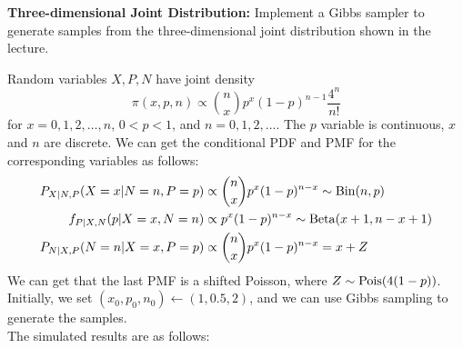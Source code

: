\begin{homeworkProblem}

\textbf{Three-dimensional Joint Distribution:} Implement a Gibbs sampler to generate samples from the three-dimensional joint distribution shown in the lecture.

\solution

Random variables $X,P,N$ have joint density
$$\pi(x,p,n)\propto \binom{n}{x}p^x(1-p)^{n-1}\dfrac{4^n}{n!}$$
for $x=0,1,2,\ldots,n$, $0<p<1$, and $n=0,1,2,\ldots$. The $p$ variable is continuous, $x$ and $n$ are discrete. We can get the conditional PDF and PMF for the corresponding variables as follows:
\begin{align*}
P_{X|N,P}(X=x|N=n,P=p) &\propto \binom{n}{x}p^x(1-p)^{n-x}\sim \operatorname{Bin}(n,p) \\
f_{P|X,N}(p|X=x,N=n) &\propto p^x(1-p)^{n-x} \sim \operatorname{Beta}(x+1,n-x+1) \\
P_{N|X,P}(N=n|X=x,P=p) &\propto \binom{n}{x}p^x(1-p)^{n-x} = x + Z
\end{align*}
We can get that the last PMF is a shifted Poisson, where $Z\sim\operatorname{Pois}(4(1-p))$. \\
Initially, we set $(x_0,p_0,n_0)\gets(1,0.5,2)$, and we can use Gibbs sampling to generate the samples. \\
The simulated results are as follows:


\end{homeworkProblem}

